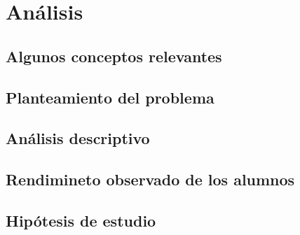 \chapter{Análisis}
	\label{chap:four}

\section{Algunos conceptos relevantes}
	
\section{Planteamiento del problema}

\section{Análisis descriptivo}

\section{Rendimineto observado de los alumnos}

\section{Hipótesis de estudio}

